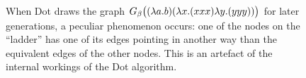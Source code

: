 \begin{figure}[htbp]
	\centering
	\caption[$(\lam{a}{b}) (\lam{x}{(xxx)} \lam{y}{(yyy)})$]
	{When Dot draws the graph $G_\beta\big((\lambda a.b) (\lambda x.(xxx) \lambda y.(yyy))\big)$
	for later generations, a peculiar phenomenon occurs: one of the nodes on the ``ladder''
	has one of its edges pointing in another way than the equivalent edges of the other
	nodes. This is an artefact of the internal workings of the Dot algorithm.}
	\label{fig:images_inf_reduction_graph_DOT}
\end{figure}

